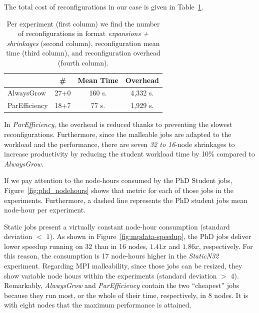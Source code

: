 \documentclass[a4paper,fleqn]{cas-dc}
\begin{document}
The total cost of reconfigurations in our case is given in Table~\ref{tab:reconfig}.
\begin{table}[tbp]
\centering
\fontsize{9.5}{14pt}\selectfont
\begin{tabular}{lccc}
\toprule
 & \textbf{\#} & \textbf{Mean Time} & \textbf{Overhead} \\
\midrule
AlwaysGrow & 27+0 & 160 s. & 4,332 s. \\
ParEfficiency & 18+7 & 77 s. & 1,929 s. \\
\bottomrule
\end{tabular}
\caption{Per experiment (first column) we find the number of reconfigurations in format \textit{expansions + shrinkages} (second column), reconfiguration mean time (third column), and reconfiguration overhead (fourth column).
}
\label{tab:reconfig}
\end{table}
In \textit{ParEfficiency}, the overhead is reduced thanks to preventing the slowest reconfigurations.
Furthermore, since the malleable jobs are adapted to the workload and the performance, there are seven \textit{32 to 16}-node shrinkages to increase productivity by reducing the student workload time by 10\% compared to \textit{AlwaysGrow}.

If we pay attention to the node-hours consumed by the PhD Student jobs, Figure~\ref{fig:phd_nodehours} shows that metric for each of those jobs in the experiments. 
Furthermore, a dashed line represents the PhD student jobs mean node-hour per experiment.

Static jobs present a virtually constant node-hour consumption (standard deviation $<$ $1$). 
As shown in Figure~\ref{fig:mpdata-speedup}, the PhD jobs deliver lower speedup running on 32 than in 16 nodes, $1.41x$ and $1.86x$, respectively.
For this reason, the consumption is 17 node-hours higher in the \textit{StaticN32} experiment.
Regarding MPI malleability, since those jobs can be resized, they show variable node hours within the experiments (standard deviation $>$ $4$).
Remarkably, \textit{AlwaysGrow} and \textit{ParEfficiency} contain the two ``cheapest'' jobs because they run most, or the whole of their time, respectively, in 8 nodes. It is with eight nodes that the maximum performance is attained.
\end{document}
